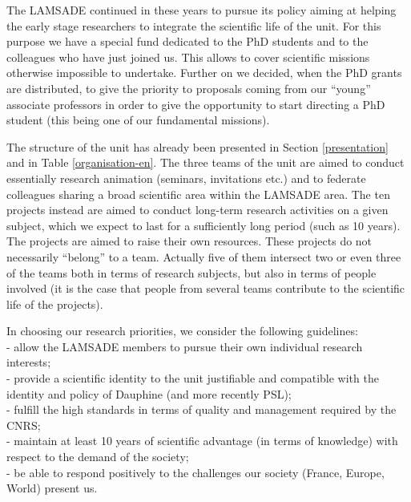 The LAMSADE continued in these years to pursue its policy aiming at helping the early stage researchers to integrate the scientific life of the unit. For this purpose we have a special fund dedicated to the PhD students and to the colleagues who have just joined us. This allows to cover scientific missions otherwise impossible to undertake. Further on we decided, when the PhD grants are distributed, to give the priority to proposals coming from our ``young'' associate professors in order to give the opportunity to start directing a PhD student (this being one of our fundamental missions).

The structure of the unit has already been presented in Section \ref{presentation} and in Table \ref{organisation-en}. The three teams of the unit are aimed to conduct essentially research animation (seminars, invitations etc.) and to federate colleagues sharing a broad scientific area within the LAMSADE area. The ten projects instead are aimed to conduct long-term research activities on a given subject, which we expect to last for a sufficiently long period (such as 10 years). The projects are aimed to raise their own resources. These projects do not necessarily ``belong'' to a team. Actually five of them intersect two or even three of the teams both in terms of research subjects, but also in terms of people involved (it is the case that people from several teams contribute to the scientific life of the projects).

In choosing our research priorities, we consider the following guidelines: \\
 - allow the LAMSADE members to pursue their own individual research interests; \\
 - provide a scientific identity to the unit justifiable and compatible with the identity and policy of Dauphine (and more recently PSL); \\
 - fulfill the high standards in terms of quality and management required by the CNRS; \\
 - maintain at least 10 years of scientific advantage (in terms of knowledge) with respect to the demand of the society; \\
 - be able to respond positively to the challenges our society (France, Europe, World) present us.

